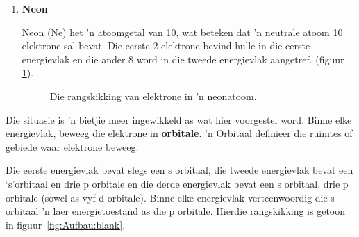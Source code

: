 \begin{enumerate}[noitemsep, label=\textbf{\arabic*}. ]
\item{\textbf{Neon} \\
\begin{minipage}{.4\textwidth}
Neon (Ne) het 'n atoomgetal van 10, wat beteken dat 'n neutrale atoom 10 elektrone sal bevat. Die eerste 2 elektrone bevind hulle in die eerste energievlak en die ander 8 word in die tweede energievlak aangetref. (figuur \ref{fig:atom:argon}).
\end{minipage}
\begin{minipage}{.6\textwidth}
\begin{figure}[H]
\begin{center}
\caption{Die rangskikking van elektrone in 'n neonatoom.}
\label{fig:atom:argon}
\end{center}
\end{figure}
\end{minipage}
}
\end{enumerate}


Die situasie is 'n bietjie meer ingewikkeld as wat hier voorgestel word. Binne elke energievlak, beweeg die elektrone in \textbf{orbitale}. 'n Orbitaal definieer die ruimtes of gebiede waar elektrone beweeg.\par 


Die eerste energievlak bevat slegs een s orbitaal, die tweede energievlak bevat een ‘s’orbitaal en drie p orbitale en die derde energievlak bevat een s orbitaal, drie p orbitale (sowel as vyf d orbitale). Binne elke energievlak verteenwoordig die s orbitaal 'n laer energietoestand as die p orbitale. Hierdie rangskikking is getoon in figuur~\ref{fig:Aufbau:blank}. 


